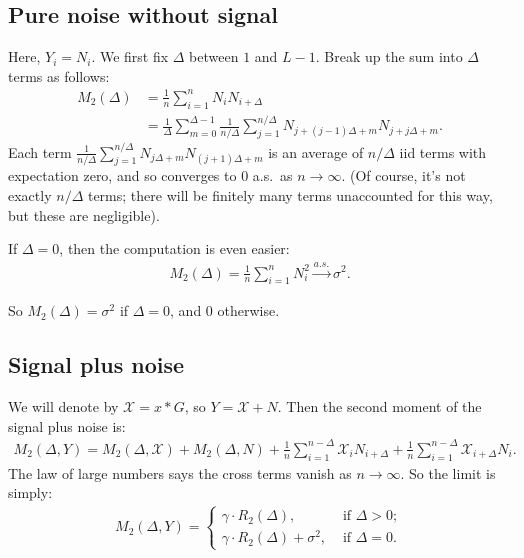 \documentclass{article}
\theoremstyle{thm}
\theoremstyle{definition}
\newcommand{\XX}{\mathcal{X}}
\newcommand{\1}{\mathbf{1}}
\begin{document}
\subsection{Pure noise without signal}

Here, $Y_i = N_i$. We first fix $\Delta$ between $1$ and $L-1$. Break up the sum into $\Delta$ terms as follows:
%
\begin{align}
%
    M_2(\Delta) &=\frac{1}{n} \sum_{i=1}^n N_i  N_{i+\Delta}
        \nonumber \\
    &= \frac{1}{\Delta} \sum_{m=0}^{\Delta-1} \frac{1}{n/\Delta}\sum_{j=1}^{n/\Delta} 
        N_{j+(j-1)\Delta + m} N_{j + j\Delta + m}.
%
\end{align}
%
Each term
%
\begin{math}
    \frac{1}{n/\Delta}\sum_{j=1}^{n/\Delta} 
        N_{j\Delta + m} N_{(j + 1)\Delta + m}
\end{math}
%
is an average of $n / \Delta$ iid terms with expectation zero, and so converges to 0 a.s.\ as $n \to \infty$. (Of course, it's not exactly $n / \Delta$ terms; there will be finitely many terms unaccounted for this way, but these are negligible).

If $\Delta = 0$, then the computation is even easier:
%
\begin{align}
%
    M_2(\Delta) = \frac{1}{n} \sum_{i=1}^n N_i^2 
        \operatorname*{\longrightarrow}^{a.s.} \sigma^2.
%
\end{align}

So $M_2(\Delta) = \sigma^2$ if $\Delta = 0$, and 0 otherwise.



%
%
%

\subsection{Signal plus noise}

We will denote by $\XX = x \ast G$, so $Y = \XX + N$. Then the second moment of the signal plus noise is:
%
\begin{align}
%
    M_2(\Delta,Y) = M_2(\Delta,\XX) + M_2(\Delta,N) 
        + \frac{1}{n}\sum_{i=1}^{n-\Delta} \XX_i N_{i+\Delta}
        + \frac{1}{n}\sum_{i=1}^{n-\Delta} \XX_{i+\Delta} N_i.
%
\end{align}
%
The law of large numbers says the cross terms vanish as $n \to \infty$. So the limit is simply:
%
\begin{align}
%
    M_2(\Delta,Y) = 
    \begin{cases}
        \gamma \cdot R_2(\Delta), &\text{ if } \Delta > 0; \\
        \gamma \cdot R_2(\Delta) + \sigma^2, &\text{ if } \Delta = 0.
    \end{cases}
%
\end{align}
\end{document}
